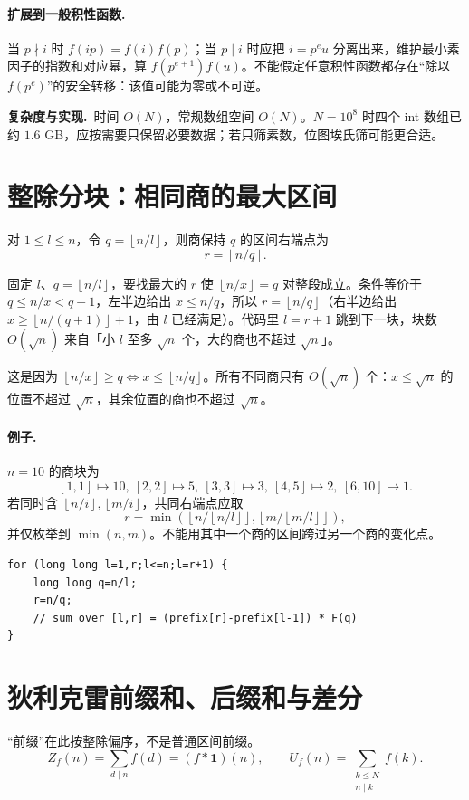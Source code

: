 \documentclass[UTF8,a4paper,11pt,twoside,openright,fontset=fandol]{ctexbook}
\theoremstyle{definition}
\newcommand{\one}{\mathbf 1}
\newcommand{\floor}[1]{\left\lfloor #1\right\rfloor}
\newcommand{\cost}{\par\noindent\textbf{复杂度与实现.}\ }
\begin{document}
\paragraph{扩展到一般积性函数.} 当 $p\nmid i$ 时 $f(ip)=f(i)f(p)$；当 $p\mid i$ 时应把 $i=p^e u$ 分离出来，维护最小素因子的指数和对应幂，算 $f(p^{e+1})f(u)$。不能假定任意积性函数都存在“除以 $f(p^e)$”的安全转移：该值可能为零或不可逆。
\cost 时间 $O(N)$，常规数组空间 $O(N)$。$N=10^8$ 时四个 int 数组已约 $1.6$ GB，应按需要只保留必要数据；若只筛素数，位图埃氏筛可能更合适。


\section{整除分块：相同商的最大区间}
对 $1\le l\le n$，令 $q=\floor{n/l}$，则商保持 $q$ 的区间右端点为
\[
 r=\floor{n/q}.
\]

\begin{tip}[$r=\floor{n/q}$ 是怎么想到的]
固定 $l$、$q=\floor{n/l}$，要找最大的 $r$ 使 $\floor{n/x}=q$ 对整段成立。条件等价于 $q\le n/x<q+1$，左半边给出 $x\le n/q$，所以 $r=\floor{n/q}$（右半边给出 $x\ge\floor{n/(q+1)}+1$，由 $l$ 已经满足）。代码里 $l=r+1$ 跳到下一块，块数 $O(\sqrt n)$ 来自「小 $l$ 至多 $\sqrt n$ 个，大的商也不超过 $\sqrt n$」。
\end{tip}

这是因为 $\floor{n/x}\ge q\iff x\le\floor{n/q}$。所有不同商只有 $O(\sqrt n)$ 个：$x\le\sqrt n$ 的位置不超过 $\sqrt n$，其余位置的商也不超过 $\sqrt n$。

\paragraph{例子.} $n=10$ 的商块为
\[
[1,1]\mapsto10,\ [2,2]\mapsto5,\ [3,3]\mapsto3,\ [4,5]\mapsto2,\ [6,10]\mapsto1.
\]
若同时含 $\floor{n/i},\floor{m/i}$，共同右端点应取
\[
 r=\min\left(\floor{n/\floor{n/l}},\floor{m/\floor{m/l}}\right),
\]
并仅枚举到 $\min(n,m)$。不能用其中一个商的区间跨过另一个商的变化点。
\begin{lstlisting}
for (long long l=1,r;l<=n;l=r+1) {
    long long q=n/l;
    r=n/q;
    // sum over [l,r] = (prefix[r]-prefix[l-1]) * F(q)
}
\end{lstlisting}


\section{狄利克雷前缀和、后缀和与差分}
“前缀”在此按整除偏序，不是普通区间前缀。
\[
 Z_f(n)=\sum_{d\mid n}f(d)=(f*\one)(n),\qquad
 U_f(n)=\sum_{\substack{k\le N\\n\mid k}}f(k).
\]
\end{document}
